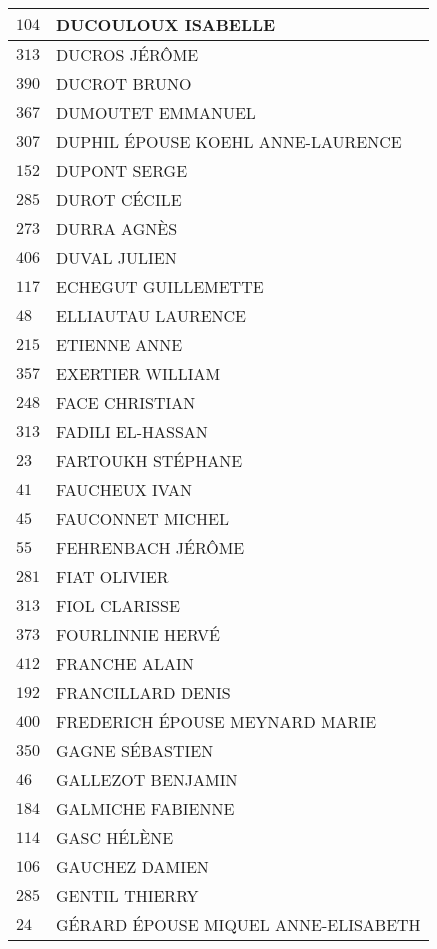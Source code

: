 \begin{xltabular}{\linewidth}{|l|X|}
    \hline
    $104$ & DUCOULOUX ISABELLE \\
    \hline
    $313$ & DUCROS JÉRÔME \\
    \hline
    $390$ & DUCROT BRUNO \\
    \hline
    $367$ & DUMOUTET EMMANUEL \\
    \hline
    $307$ & DUPHIL ÉPOUSE KOEHL ANNE-LAURENCE \\
    \hline
    $152$ & DUPONT SERGE \\
    \hline
    $285$ & DUROT CÉCILE \\
    \hline
    $273$ & DURRA AGNÈS \\
    \hline
    $406$ & DUVAL JULIEN \\
    \hline
    $117$ & ECHEGUT GUILLEMETTE \\
    \hline
    $48$ & ELLIAUTAU LAURENCE \\
    \hline
    $215$ & ETIENNE ANNE \\
    \hline
    $357$ & EXERTIER WILLIAM \\
    \hline
    $248$ & FACE CHRISTIAN \\
    \hline
    $313$ & FADILI EL-HASSAN \\
    \hline
    $23$ & FARTOUKH STÉPHANE \\
    \hline
    $41$ & FAUCHEUX IVAN \\
    \hline
    $45$ & FAUCONNET MICHEL \\
    \hline
    $55$ & FEHRENBACH JÉRÔME \\
    \hline
    $281$ & FIAT OLIVIER \\
    \hline
    $313$ & FIOL CLARISSE \\
    \hline
    $373$ & FOURLINNIE HERVÉ \\
    \hline
    $412$ & FRANCHE ALAIN \\
    \hline
    $192$ & FRANCILLARD DENIS \\
    \hline
    $400$ & FREDERICH ÉPOUSE MEYNARD MARIE \\
    \hline
    $350$ & GAGNE SÉBASTIEN \\
    \hline
    $46$ & GALLEZOT BENJAMIN \\
    \hline
    $184$ & GALMICHE FABIENNE \\
    \hline
    $114$ & GASC HÉLÈNE \\
    \hline
    $106$ & GAUCHEZ DAMIEN \\
    \hline
    $285$ & GENTIL THIERRY \\
    \hline
    $24$ & GÉRARD ÉPOUSE MIQUEL ANNE-ELISABETH \\

\end{xltabular}

